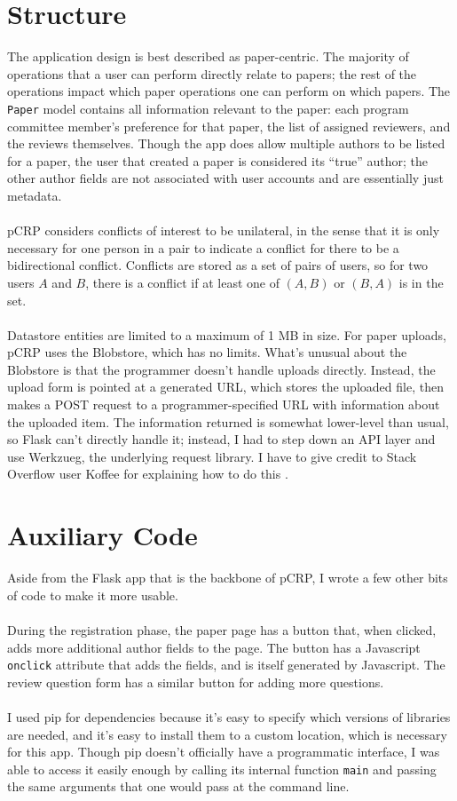 \documentclass[12pt]{article}
\begin{document}
\section{Structure}
	The application design is best described as paper-centric. The majority
	of operations that a user can perform directly relate to papers; the
	rest of the operations impact which paper operations one can perform on
	which papers. The \texttt{Paper} model contains all information relevant
	to the paper: each program committee member's preference for that paper,
	the list of assigned reviewers, and the reviews themselves. Though the
	app does allow multiple authors to be listed for a paper, the user that
	created a paper is considered its ``true'' author; the other author
	fields are not associated with user accounts and are essentially just
	metadata.
	\\\\
	pCRP considers conflicts of interest to be unilateral, in the sense that
	it is only necessary for one person in a pair to indicate a conflict for
	there to be a bidirectional conflict. Conflicts are stored as a set of
	pairs of users, so for two users $A$ and $B$, there is a conflict if
	at least one of $(A,B)$ or $(B,A)$ is in the set.
	\\\\
	Datastore entities are limited to a maximum of 1 MB in size. For paper
	uploads, pCRP uses the Blobstore, which has no limits. What's unusual
	about the Blobstore is that the programmer doesn't handle uploads
	directly. Instead, the upload form is pointed at a generated URL, which
	stores the uploaded file, then makes a POST request to a
	programmer-specified URL with information about the uploaded item. The
	information returned is somewhat lower-level than usual, so Flask can't
	directly handle it; instead, I had to step down an API layer and use
	Werkzueg, the underlying request library. I have to give credit to
	Stack Overflow user Koffee for explaining how to do this \cite{koffee}.

\section{Auxiliary Code}
	Aside from the Flask app that is the backbone of pCRP, I wrote a few
	other bits of code to make it more usable.
	\\\\
	During the registration phase, the paper page has a button that, when
	clicked, adds more additional author fields to the page. The button
	has a Javascript \texttt{onclick} attribute that adds the fields, and
	is itself generated by Javascript. The review question form has a
	similar button for adding more questions.
	\\\\
	I used pip for dependencies because it's easy to specify which versions
	of libraries are needed, and it's easy to install them to a custom
	location, which is necessary for this app. Though pip doesn't officially
	have a programmatic interface, I was able to access it easily enough
	by calling its internal function \texttt{main} and passing the same
	arguments that one would pass at the command line.
\end{document}
